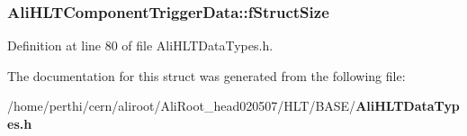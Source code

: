\subsubsection{ {\bf Ali\-HLTComponent\-Trigger\-Data::f\-Struct\-Size}}\label{structAliHLTComponentTriggerData_o0}




Definition at line 80 of file Ali\-HLTData\-Types.h.

The documentation for this struct was generated from the following file:\begin{CompactItemize}
\item 
/home/perthi/cern/aliroot/Ali\-Root\_\-head020507/HLT/BASE/{\bf Ali\-HLTData\-Types.h}\end{CompactItemize}
